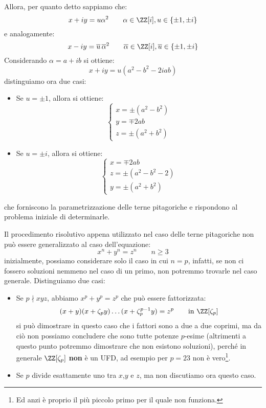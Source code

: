 \documentclass[11pt]{scrartcl}
\begin{document}
Allora, per quanto detto sappiamo che:
\[ x + iy = u\alpha^2 \qquad \alpha \in \ZZ[i], u \in \{\pm 1, \pm i\}
\]
e analogamente:
\[ x - iy = \overline u \,\overline\alpha^2 \qquad \overline\alpha \in \ZZ[i], \overline u \in \{\pm 1, \pm i\}
    \]
Considerando $\alpha = a+ib$ si ottiene:
\[ x + iy = u(a^2-b^2-2iab)
    \]
distinguiamo ora due casi:
\begin{itemize}
    \item Se $u = \pm 1$, allora si ottiene:
    \[ \begin{cases}
        x = \pm(a^2-b^2) \\
        y = \mp 2ab \\
        z = \pm (a^2+b^2)
    \end{cases}
        \]
    \item Se $u = \pm i$, allora si ottiene:
    \[ \begin{cases}
        x = \mp 2ab \\
        z = \pm(a^2-b^2-2) \\
        y = \pm (a^2+b^2)
    \end{cases}
    \]
\end{itemize}
che forniscono la parametrizzazione delle terne pitagoriche e rispondono al problema iniziale di determinarle.

\newpage
\begin{remark}
    Il procedimento risolutivo appena utilizzato nel caso delle terne pitagoriche non può essere generalizzato al caso dell'equazione:
    \[ x^n + y^n = z^n \qquad n\geq 3
        \]
    inizialmente, possiamo considerare solo il caso in cui $n = p$, infatti, se non ci fossero soluzioni nemmeno nel caso di un primo, non potremmo
    trovarle nel caso generale. Distinguiamo due casi:
    \begin{itemize}
        \item Se $p \nmid xyz$, abbiamo $x^p+y^p = z^p$ che può essere fattorizzata:
            \[ (x+y)(x+\zeta_py) \ldots (x + \zeta_p^{p-1}y) = z^p \qquad \text{in $\ZZ[\zeta_p]$}
                \]
            si può dimostrare in questo caso che i fattori sono a due a due coprimi,
            ma da ciò non possiamo concludere che sono tutte potenze $p$-esime (altrimenti a questo punto potremmo dimostrare che non esistono soluzioni),
            perché in generale $\ZZ[\zeta_p]$ \textbf{non} è un UFD, ad esempio per $p = 23$ non è vero\footnote{Ed anzi è proprio il più piccolo primo per il quale non funziona.}.
        \item Se $p$ divide esattamente uno tra $x$,$y$ e $z$, ma non discutiamo ora questo caso.
    \end{itemize}
\end{remark}
\end{document}
